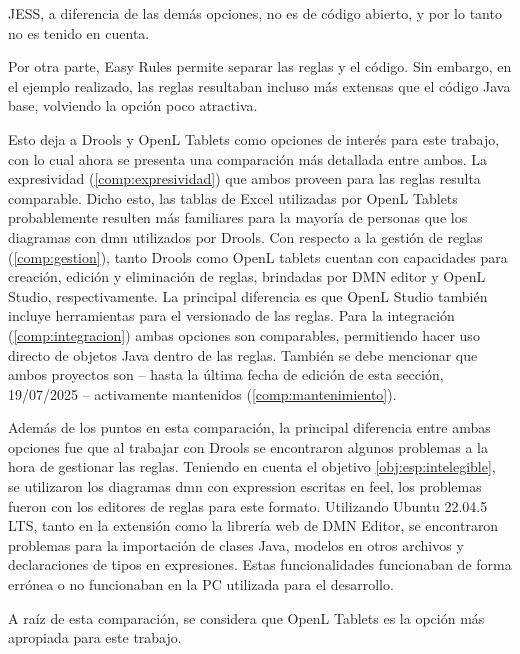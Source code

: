 JESS, a diferencia de las demás opciones, no es de código abierto, y por lo tanto no es tenido en cuenta.

Por otra parte, Easy Rules permite separar las reglas y el código. 
Sin embargo, en el ejemplo realizado, las reglas resultaban incluso más extensas que el código Java base, volviendo la opción poco atractiva.

Esto deja a Drools y OpenL Tablets como opciones de interés para este trabajo, con lo cual ahora se presenta una comparación más detallada entre ambos. 
%
La expresividad (\cref{comp:expresividad}) que ambos proveen para las reglas resulta comparable. Dicho esto, las tablas de Excel utilizadas por OpenL Tablets probablemente resulten más familiares para la mayoría de personas que los diagramas con \acrfull{dmn} utilizados por Drools.
%
Con respecto a la gestión de reglas (\cref{comp:gestion}), tanto Drools como OpenL tablets cuentan con capacidades para creación, edición y eliminación de reglas, brindadas por DMN editor y OpenL Studio, respectivamente. 
La principal diferencia es que OpenL Studio también incluye herramientas para el versionado de las reglas.
%
Para la integración (\cref{comp:integracion}) ambas opciones son comparables, permitiendo hacer uso directo de objetos Java dentro de las reglas.
%
También se debe mencionar que ambos proyectos son -- hasta la última fecha de edición de esta sección, 19/07/2025 -- activamente mantenidos (\cref{comp:mantenimiento}).


Además de los puntos en esta comparación, la principal diferencia entre ambas opciones fue que al trabajar con Drools se encontraron algunos problemas a la hora de gestionar las reglas. Teniendo en cuenta el objetivo \ref{obj:esp:intelegible}, se utilizaron los diagramas \acrshort{dmn} con expression escritas en \acrfull{feel}, los problemas fueron con los editores de reglas para este formato.
Utilizando Ubuntu 22.04.5 LTS, tanto en la extensión como la librería web de DMN Editor, se encontraron problemas para la importación de clases Java, modelos en otros archivos y declaraciones de tipos en expresiones. Estas funcionalidades funcionaban de forma errónea o no funcionaban en la PC utilizada para el desarrollo.

A raíz de esta comparación, se considera que OpenL Tablets es la opción más apropiada para este trabajo.

